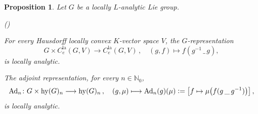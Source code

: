 \documentclass[a4paper, reqno, 10pt]{amsart}
\newtheorem{proposition}[theorem]{Proposition}
\theoremstyle{definition}
\newenvironment{altenumerate}
	{\begin{list}
		{\textup{(\theenumi)} }
		{\usecounter{enumi}
			\setlength{\labelwidth}{0pt}
			\setlength{\labelsep}{0pt}
			\setlength{\leftmargin}{0pt}
			\setlength{\itemsep}{0pt}
			\setlength{\topsep}{0pt}
		\renewcommand{\theenumi}{\roman{enumi}}
		}}
	{\end{list}}
\numberwithin{equation}{section}
\newcommand{\Ad}{{\mathrm{Ad}}}
\newcommand{\blank}{{\,\_\,}}
\newcommand{\defeq}{\vcentcolon=}
\newcommand{\hy}{{\mathrm{hy}}}
\newcommand{\la}{{\mathrm{la}}}
\newcommand{\lra}{\longrightarrow}
\newcommand{\lto}{\longmapsto}
\newcommand{\mto}{\mapsto}
\newcommand{\BN}{{\mathbb {N}}}
\begin{document}
\begin{proposition}
	Let $G$ be a locally $L$-analytic Lie group.
	\begin{altenumerate}
		\item
		For every Hausdorff locally convex $K$-vector space $V$, the $G$-representation
		\begin{equation}\label{Eq 1 - Conjugation action on germs of locally analytic functions}
			G \times C^\la_e (G,V) \lra C^\la_e (G,V) \,,\quad (g,f) \lto f(g^{-1} \blank g),
		\end{equation}
		is locally analytic.
		\item
		The \textit{adjoint representation}, for every $n\in \BN_0$,
		\begin{equation*}
			\Ad_n \colon G \times \hy(G)_n \lra \hy(G)_n \,,\quad (g, \mu) \lto \Ad_n(g)(\mu) \defeq \left[f \mto \mu\big(f(g\blank g^{-1})\big)\right] , 
		\end{equation*}
		is locally analytic.
	\end{altenumerate}
\end{proposition}
\end{document}
